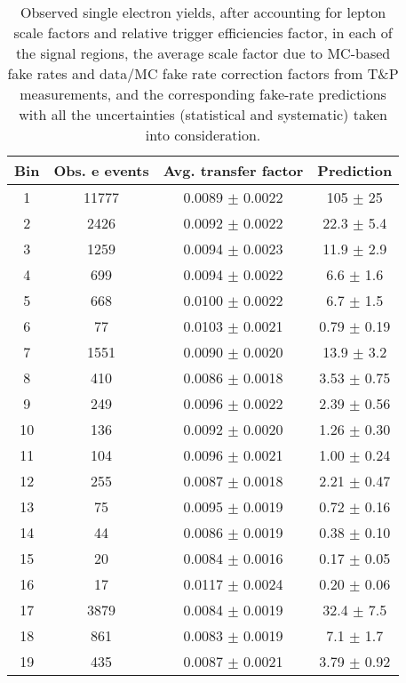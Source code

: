 \begin{table}
\centering
\caption[Fake rate predictions in high \dphi]{Observed single electron yields, after accounting for lepton scale factors
and relative trigger efficiencies factor, in each of the signal regions, the 
average scale factor due to MC-based fake rates and data/MC fake rate correction
factors from T\&P measurements, and the corresponding fake-rate predictions with all the uncertainties (statistical and systematic) taken into consideration.}
\label{tab:fakeRatePredictions}
\begin{tabular}{c|c|c|c}
Bin & Obs. e events & Avg. transfer factor  & Prediction \\ \hline\hline
1 & 11777  & 0.0089  $\pm$  0.0022  & 105 $\pm$ 25   \\\hline
2 & 2426  & 0.0092  $\pm$  0.0022  & 22.3 $\pm$ 5.4   \\\hline
3 & 1259  & 0.0094  $\pm$  0.0023  & 11.9 $\pm$ 2.9   \\\hline
4 & 699  & 0.0094  $\pm$  0.0022  & 6.6 $\pm$ 1.6   \\\hline
5 & 668  & 0.0100  $\pm$  0.0022  & 6.7 $\pm$ 1.5   \\\hline
6 & 77  & 0.0103  $\pm$  0.0021  & 0.79 $\pm$ 0.19   \\\hline
7 & 1551  & 0.0090  $\pm$  0.0020  & 13.9 $\pm$ 3.2   \\\hline
8 & 410  & 0.0086  $\pm$  0.0018  & 3.53 $\pm$ 0.75   \\\hline
9 & 249  & 0.0096  $\pm$  0.0022  & 2.39 $\pm$ 0.56   \\\hline
10 & 136  & 0.0092  $\pm$  0.0020  & 1.26 $\pm$ 0.30   \\\hline
11 & 104  & 0.0096  $\pm$  0.0021  & 1.00 $\pm$ 0.24   \\\hline
12 & 255  & 0.0087  $\pm$  0.0018  & 2.21 $\pm$ 0.47   \\\hline
13 & 75  & 0.0095  $\pm$  0.0019  & 0.72 $\pm$ 0.16   \\\hline
14 & 44  & 0.0086  $\pm$  0.0019  & 0.38 $\pm$ 0.10   \\\hline
15 & 20  & 0.0084  $\pm$  0.0016  & 0.17 $\pm$ 0.05   \\\hline
16 & 17  & 0.0117  $\pm$  0.0024  & 0.20 $\pm$ 0.06   \\\hline
17 & 3879  & 0.0084  $\pm$  0.0019  & 32.4 $\pm$ 7.5   \\\hline
18 & 861  & 0.0083  $\pm$  0.0019  & 7.1 $\pm$ 1.7   \\\hline
19 & 435  & 0.0087  $\pm$  0.0021  & 3.79 $\pm$ 0.92   \\\hline

\end{tabular}
\end{table}
